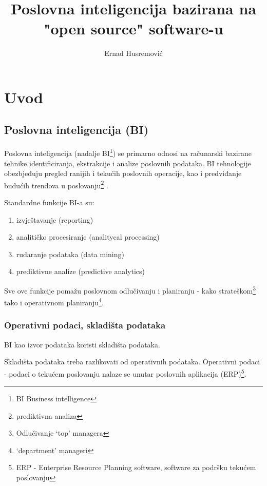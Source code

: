 \documentclass[times, utf8, seminar]{fit}
\begin{document}
\title{Poslovna inteligencija bazirana na "open source" software-u}

\author{Ernad Husremović}


\maketitle

\tableofcontents

\chapter{Uvod}

\section{Poslovna inteligencija (BI)}

Poslovna inteligencija (nadalje BI\footnote{BI Business intelligence}) se primarno odnosi na računarski bazirane tehnike identificiranja, ekstrakcije i analize poslovnih podataka.  BI tehnologije obezbjeđuju pregled ranijih i tekućih poslovnih operacije, kao i predviđanje budućih trendova u poslovanju\footnote{prediktivna analiza} \cite{web:wikipedia:bi}.

Standardne funkcije BI-a su:

\begin{enumerate}
  \item izvještavanje (reporting)
  \item analitičko procesiranje (analitycal processing)
  \item rudaranje podataka (data mining)
  \item prediktivne analize (predictive analytics)
\end{enumerate}

Sve ove funkcije pomažu poslovnom odlučivanju i planiranju - kako strateškom\footnote{Odlučivanje `top' managera} tako i operativnom planiranju\footnote{`department' manageri}.

\subsection{Operativni podaci, skladišta podataka}
\label{operativni_podaci}

BI kao izvor podataka koristi skladišta podataka.

Skladišta podataka treba razlikovati od operativnih podataka. Operativni podaci - podaci o tekućem poslovanju nalaze se unutar poslovnih aplikacija (ERP)\footnote{ERP - Enterprise Resource Planning software, software za podršku tekućem poslovanju}.
\end{document}

